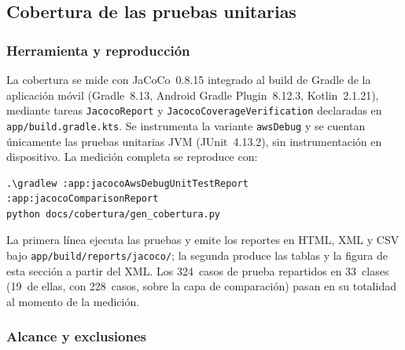 
\subsection{Cobertura de las pruebas unitarias}
\label{subsec:cobertura}

\subsubsection{Herramienta y reproducción}

La cobertura se mide con JaCoCo~0.8.15 integrado al build de Gradle de la aplicación
móvil (Gradle~8.13, Android Gradle Plugin~8.12.3, Kotlin~2.1.21), mediante tareas
\texttt{JacocoReport} y \texttt{JacocoCoverageVerification} declaradas en
\texttt{app/build.gradle.kts}. Se instrumenta la variante \texttt{awsDebug}
y se cuentan únicamente las pruebas unitarias JVM (JUnit~4.13.2), sin instrumentación en
dispositivo. La medición completa se reproduce con:

\begin{verbatim}
.\gradlew :app:jacocoAwsDebugUnitTestReport :app:jacocoComparisonReport
python docs/cobertura/gen_cobertura.py
\end{verbatim}

La primera línea ejecuta las pruebas y emite los reportes en HTML, XML y CSV bajo
\texttt{app/build/reports/jacoco/}; la segunda produce las tablas y la figura de esta
sección a partir del XML. Los 324~casos de prueba repartidos en 33~clases (19~de ellas,
con 228~casos, sobre la capa de comparación)
pasan en su totalidad al momento de la medición.

\subsubsection{Alcance y exclusiones}

